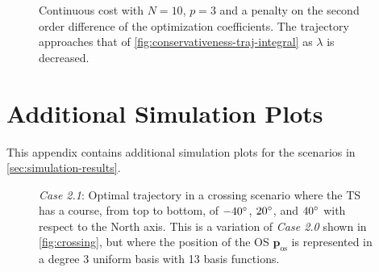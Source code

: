 \begin{figure}
    \centering
    
    \caption{Continuous cost with $N=10$, $p=3$ and a penalty on the second order difference of the optimization coefficients. The trajectory approaches that of \cref{fig:conservativeness-traj-integral} as $\lambda$ is decreased.}\label{fig:conservativeness-oscillation-damping}
\end{figure}


\chapter{Additional Simulation Plots}\label{app:additional-simulation-plots}

This appendix contains additional simulation plots for the scenarios in \cref{sec:simulation-results}.


\begin{figure}
    \centering
    
    \caption{\emph{Case 2.1}: Optimal trajectory in a crossing scenario where the TS has a course, from top to bottom, of $-40\degree$, $20\degree$, and $40\degree$ with respect to the North axis. This is a variation of \emph{Case 2.0} shown in \cref{fig:crossing}, but where the position of the OS $\mathbf p_\text{os}$ is represented in a degree 3 uniform basis with 13 basis functions.}
    \label{fig:crossing-advanced-scenario-10-3}
\end{figure}

